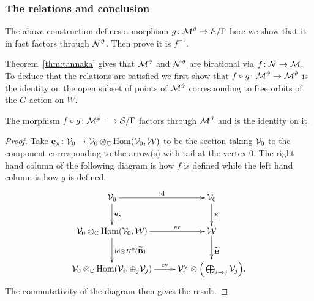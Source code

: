 \documentclass{amsart}
\theoremstyle{definition}
\begin{document}

\subsubsection{The relations and conclusion}

The above construction defines a morphism $g \colon \mathcal{M}^\vartheta \rightarrow \mathbb{A}/\Gamma$ here we show that it in fact factors through $\mathcal{N}^\vartheta$.
Then prove it is $f^{-1}$.

Theorem~\ref{thm:tannaka} gives that $\mathcal{M}^\vartheta$ and $\mathcal{N}^\vartheta$ are birational via $f \colon \mathcal{N} \rightarrow \mathcal{M}$.
To deduce that the relations are satisfied we first show that $f \circ g \colon \mathcal{M}^\vartheta \rightarrow \mathcal{M}^\vartheta$ is the identity on the open subset of points of $\mathcal{M}^\vartheta$ corresponding to free orbits of the $G$-action on $W$.

\begin{theorem}\label{thm:fg}
The morphism $f \circ g \colon \mathcal{M}^{\vartheta} \longrightarrow \mathcal{S}/\Gamma$ factors through $\mathcal{M}^\vartheta$ and is the identity on it.
\end{theorem}

\begin{proof}
Take $\mathbf{e}_{\mathbf{x}} \colon \mathcal{V}_0 \rightarrow \mathcal{V}_0 \otimes_{\mathbb{C}} \operatorname{Hom}(\mathcal{V}_0, \mathcal{W})$ to be the section taking $\mathcal{V}_0$ to the component corresponding to the arrow(s) with tail at the vertex $0$.
The right hand column of the following diagram is how $f$ is defined while the left hand column is how $g$ is defined.
\begin{equation}\label{eq:gf}
    \xymatrix{\cV_0 \ar[r]^{\text{id}} \ar[d]^{\bfe_\bfx} & \cV_0 \ar[d]^\bfx \\
    \cV_0 \otimes_\bC \Hom(\cV_0, \cW) \ar[r]^-{\text{ev}} \ar[d]^{\text{id} \otimes H^0({\widetilde{\bfB}})} & \cW \ar[d]^{\widetilde{\bfB}} \\
    \cV_0 \otimes_\bC \Hom(\cV_i, \oplus_j \cV_j) \ar[r]^-{\text{ev}} & \cV_i^\vee \otimes \Big(\bigoplus_{i \rightarrow j}\cV_j\Big).
    }
\end{equation}
The commutativity of the diagram then gives the result.
\end{proof}
\end{document}
